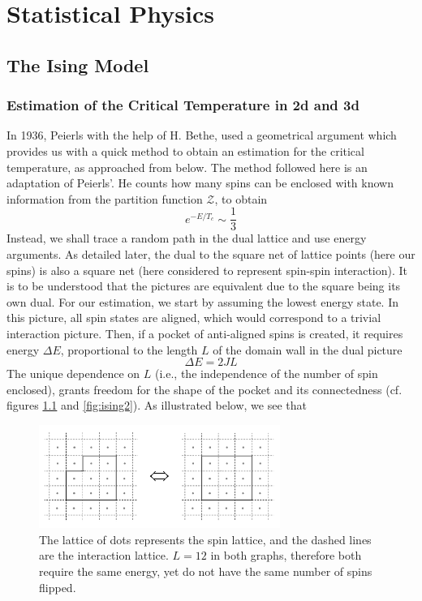 \chapter{Statistical Physics}
\adjustmtc
\minitoc
\section{The Ising Model}
\subsection{Estimation of the Critical Temperature in 2d and 3d}
In 1936, Peierls with the help of H. Bethe, used a geometrical argument
which provides us with a quick method to obtain an estimation for the
critical temperature,  as approached from below. The method followed here
is an adaptation of Peierls'. He counts how many spins can be enclosed
with known information from the partition function $\mathcal{Z}$, to obtain
\begin{equation}
  e^{-E/T_c}\sim \frac{1}{3}
\end{equation}
Instead, we shall trace a random path in the dual lattice and use energy
arguments. As detailed later, the dual to the square net of lattice points
(here our spins) is also a square net (here considered to represent spin-spin
interaction). It is to be understood that the pictures are equivalent due to
the square being its own dual. For our estimation, we start by assuming 
the lowest energy state. In this picture, all spin states are aligned, which
would correspond to a trivial interaction picture. Then, if a pocket of
anti-aligned spins is created, it requires energy $\Delta E$, proportional
to the length $L$ of the domain wall in the dual picture
\begin{equation}
  \Delta E = 2 JL
  \label{eq:energyreq}
\end{equation}
The unique dependence on $L$ (i.e., the independence of the number of spin
enclosed), grants freedom for the shape of the pocket and its connectedness
(cf. figures \ref{fig:ising1} and \ref{fig:ising2}). As illustrated below,
we see that
\begin{figure}[h]
  \centering
  \includegraphics[width=0.7\textwidth]{Images/ising1.png}
  \caption{The lattice of dots represents the spin lattice, and the dashed
    lines are the interaction lattice. $L=12$ in both graphs, therefore both
    require the same energy, yet do not have the same number of spins flipped.}
    \label{fig:ising1}
\end{figure}
